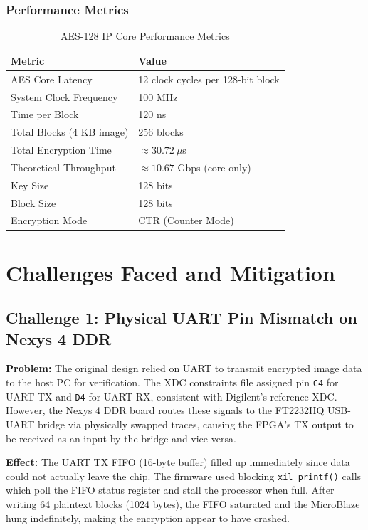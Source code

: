 \documentclass[12pt,a4paper]{article}
\begin{document}
\subsubsection{Performance Metrics}

\begin{table}[H]
\centering
\caption{AES-128 IP Core Performance Metrics}
\begin{tabular}{ll}
\toprule
\textbf{Metric} & \textbf{Value} \\
\midrule
AES Core Latency          & 12 clock cycles per 128-bit block \\
System Clock Frequency    & 100 MHz \\
Time per Block            & 120 ns \\
Total Blocks (4 KB image) & 256 blocks \\
Total Encryption Time     & $\approx 30.72\ \mu$s \\
Theoretical Throughput    & $\approx 10.67$ Gbps (core-only) \\
Key Size                  & 128 bits \\
Block Size                & 128 bits \\
Encryption Mode           & CTR (Counter Mode) \\
\bottomrule
\end{tabular}
\end{table}

\section{Challenges Faced and Mitigation}
\label{sec:challenges}

\subsection{Challenge 1: Physical UART Pin Mismatch on Nexys 4 DDR}

\textbf{Problem:} The original design relied on UART to transmit encrypted image data to the host PC for verification. The XDC constraints file assigned pin \texttt{C4} for UART TX and \texttt{D4} for UART RX, consistent with Digilent's reference XDC. However, the Nexys 4 DDR board routes these signals to the FT2232HQ USB-UART bridge via physically swapped traces, causing the FPGA's TX output to be received as an input by the bridge and vice versa.

\textbf{Effect:} The UART TX FIFO (16-byte buffer) filled up immediately since data could not actually leave the chip. The firmware used blocking \texttt{xil\_printf()} calls which poll the FIFO status register and stall the processor when full. After writing 64 plaintext blocks (1024 bytes), the FIFO saturated and the MicroBlaze hung indefinitely, making the encryption appear to have crashed.
\end{document}
